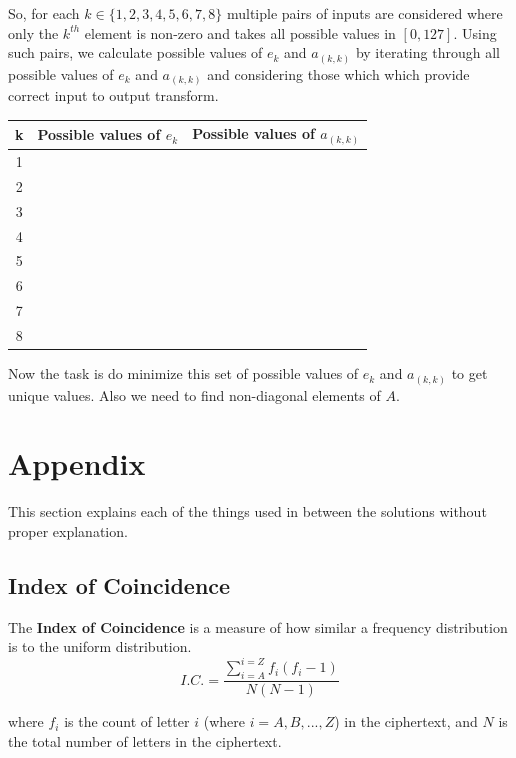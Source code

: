 \documentclass[10pt,twoside]{article}
\begin{document}
So, for each $k \in \{1,2,3,4,5,6,7,8\}$ multiple pairs of inputs are considered where only the $k^{th}$ element is non-zero and takes all possible values in $[0, 127]$. Using such pairs, we calculate possible values of $e_k$ and $a_{(k,k)}$ by iterating through all possible values of $e_k$ and $a_{(k,k)}$ and considering those which which provide correct input to output transform.\\
\begin{center}
    

\begin{tabular}{|c|c|c|}
    \hline
    k & Possible values of $e_k$ & Possible values of $a_{(k,k)}$\\
    \hline
    1 & &\\
    2 & &\\
    3 & &\\
    4 & &\\
    5 & &\\
    6 & &\\
    7 & &\\
    8 & &\\
    \hline
\end{tabular}
\end{center}

Now the task is do minimize this set of possible values of $e_k$ and  $a_{(k,k)}$ to get unique values. Also we need to find non-diagonal elements of $A$.


\newpage
\section{Appendix}

This section explains each of the things used in between the solutions without proper explanation.

\subsection{Index of Coincidence} \label{ic}

The \textbf{Index of Coincidence} is a measure of how similar a frequency distribution is to the uniform distribution.
$$ I.C. = \frac{\sum_{i=A}^{i=Z} f_i(f_i-1)}{N(N-1)}$$

where $f_i$ is the count of letter $i$ (where $i = A,B,...,Z$) in the ciphertext, and $N$ is the total number of letters in the ciphertext. \newline
\end{document}
